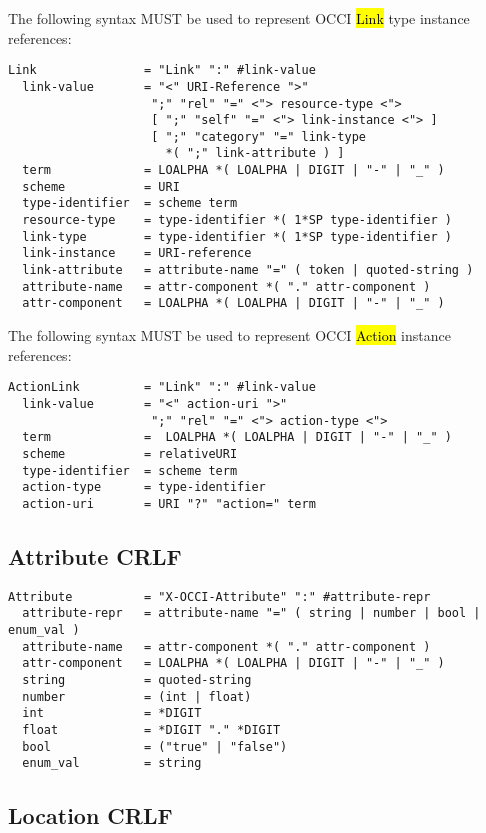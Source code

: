 \documentclass[10pt,a4paper]{article}
\begin{document}
The following syntax MUST be used to represent OCCI \hl{Link} type
instance references:

\begin{verbatim}
Link               = "Link" ":" #link-value
  link-value       = "<" URI-Reference ">"
                    ";" "rel" "=" <"> resource-type <">
                    [ ";" "self" "=" <"> link-instance <"> ]
                    [ ";" "category" "=" link-type
                      *( ";" link-attribute ) ]
  term             = LOALPHA *( LOALPHA | DIGIT | "-" | "_" )
  scheme           = URI
  type-identifier  = scheme term
  resource-type    = type-identifier *( 1*SP type-identifier )
  link-type        = type-identifier *( 1*SP type-identifier )
  link-instance    = URI-reference
  link-attribute   = attribute-name "=" ( token | quoted-string )
  attribute-name   = attr-component *( "." attr-component )
  attr-component   = LOALPHA *( LOALPHA | DIGIT | "-" | "_" )
\end{verbatim}

The following syntax MUST be used to represent OCCI \hl{Action}
instance references:

\begin{verbatim}
ActionLink         = "Link" ":" #link-value
  link-value       = "<" action-uri ">"
                    ";" "rel" "=" <"> action-type <">
  term             =  LOALPHA *( LOALPHA | DIGIT | "-" | "_" )
  scheme           = relativeURI
  type-identifier  = scheme term
  action-type      = type-identifier
  action-uri       = URI "?" "action=" term
\end{verbatim}

\subsection{Attribute CRLF}

\begin{verbatim}
Attribute          = "X-OCCI-Attribute" ":" #attribute-repr
  attribute-repr   = attribute-name "=" ( string | number | bool | enum_val )
  attribute-name   = attr-component *( "." attr-component )
  attr-component   = LOALPHA *( LOALPHA | DIGIT | "-" | "_" )	
  string           = quoted-string
  number           = (int | float)
  int              = *DIGIT
  float            = *DIGIT "." *DIGIT
  bool             = ("true" | "false")
  enum_val         = string
\end{verbatim}

\subsection{Location CRLF}
\end{document}
